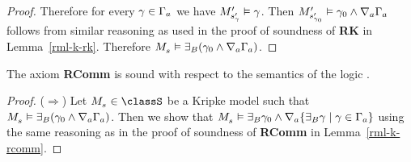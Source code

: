 \begin{proof}
Therefore for every $\gamma \in \Gamma_a$ we have ${M^{\prime}_{{s}^{\prime}_\gamma}} \vDash \gamma$.
Then ${M^{\prime}_{{s}^{\prime}_{\gamma_0}}} \vDash \gamma_0 \land \nabla_{a} \Gamma_a$ follows from similar reasoning as used in the proof of soundness of {\bf RK} in Lemma~\ref{rml-k-rk}.
Therefore $\kPModel{\kStateS} \entails \somerefsBs (\gamma_0 \land \coversA \Gamma_\agentA)$.
\end{proof}

\begin{lemma}
The axiom {\bf RComm} is sound with respect to the semantics of the logic \logicRmlS{}.
\end{lemma}

\begin{proof}
($\Rightarrow$)
Let $\kPModel{\kStateS} \in \classS$ be a Kripke model such that $\kPModel{\kStateS} \entails \somerefsBs (\gamma_0 \land \coversA \Gamma_\agentA)$.
Then we show that $\kPModel{\kStateS} \entails \somerefsBs \gamma_0 \land \coversA \{\somerefsBs \gamma \mid \gamma \in \Gamma_\agentA\}$ using the same reasoning as in the proof of soundness of {\bf RComm} in Lemma~\ref{rml-k-rcomm}.


\end{proof}
